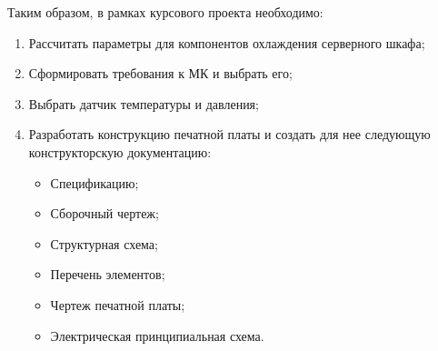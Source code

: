 
Таким образом, в рамках курсового проекта необходимо:

\begin{enumerate}

	\item Рассчитать параметры для компонентов охлаждения серверного шкафа;
	
	\item Сформировать требования к МК и выбрать его;
	
	\item Выбрать датчик температуры и давления;
	
	\item Разработать конструкцию печатной платы и создать для нее следующую конструкторскую 
	документацию:
	
	\begin{itemize}
	
		\item Спецификацию; 
		
		\item Сборочный чертеж;
		
		\item Структурная схема;
		
		\item Перечень элементов;
		
		\item Чертеж печатной платы;
		
		\item Электрическая принципиальная схема.
	
	\end{itemize}
	
\end{enumerate}